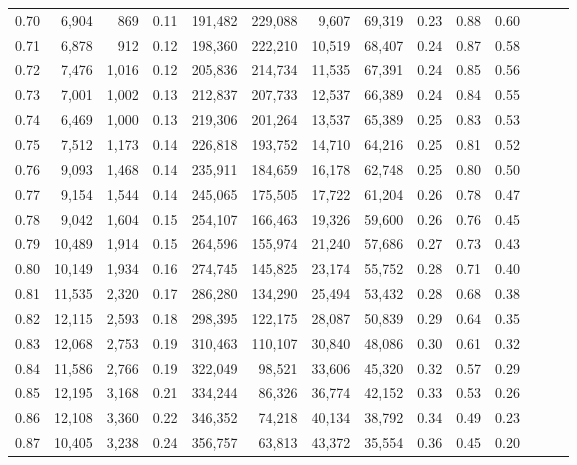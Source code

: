 \begin{tabular}{rrrrrrrrrrrrrr}
0.70 &   6,904 &    869 &  0.11 &  191,482 &  229,088 &   9,607 &  69,319 &  0.23 &  0.88 &      0.60 \\
0.71 &   6,878 &    912 &  0.12 &  198,360 &  222,210 &  10,519 &  68,407 &  0.24 &  0.87 &      0.58 \\
0.72 &   7,476 &  1,016 &  0.12 &  205,836 &  214,734 &  11,535 &  67,391 &  0.24 &  0.85 &      0.56 \\
0.73 &   7,001 &  1,002 &  0.13 &  212,837 &  207,733 &  12,537 &  66,389 &  0.24 &  0.84 &      0.55 \\
0.74 &   6,469 &  1,000 &  0.13 &  219,306 &  201,264 &  13,537 &  65,389 &  0.25 &  0.83 &      0.53 \\
0.75 &   7,512 &  1,173 &  0.14 &  226,818 &  193,752 &  14,710 &  64,216 &  0.25 &  0.81 &      0.52 \\
0.76 &   9,093 &  1,468 &  0.14 &  235,911 &  184,659 &  16,178 &  62,748 &  0.25 &  0.80 &      0.50 \\
0.77 &   9,154 &  1,544 &  0.14 &  245,065 &  175,505 &  17,722 &  61,204 &  0.26 &  0.78 &      0.47 \\
0.78 &   9,042 &  1,604 &  0.15 &  254,107 &  166,463 &  19,326 &  59,600 &  0.26 &  0.76 &      0.45 \\
0.79 &  10,489 &  1,914 &  0.15 &  264,596 &  155,974 &  21,240 &  57,686 &  0.27 &  0.73 &      0.43 \\
0.80 &  10,149 &  1,934 &  0.16 &  274,745 &  145,825 &  23,174 &  55,752 &  0.28 &  0.71 &      0.40 \\
0.81 &  11,535 &  2,320 &  0.17 &  286,280 &  134,290 &  25,494 &  53,432 &  0.28 &  0.68 &      0.38 \\
0.82 &  12,115 &  2,593 &  0.18 &  298,395 &  122,175 &  28,087 &  50,839 &  0.29 &  0.64 &      0.35 \\
0.83 &  12,068 &  2,753 &  0.19 &  310,463 &  110,107 &  30,840 &  48,086 &  0.30 &  0.61 &      0.32 \\
0.84 &  11,586 &  2,766 &  0.19 &  322,049 &   98,521 &  33,606 &  45,320 &  0.32 &  0.57 &      0.29 \\
0.85 &  12,195 &  3,168 &  0.21 &  334,244 &   86,326 &  36,774 &  42,152 &  0.33 &  0.53 &      0.26 \\
0.86 &  12,108 &  3,360 &  0.22 &  346,352 &   74,218 &  40,134 &  38,792 &  0.34 &  0.49 &      0.23 \\
0.87 &  10,405 &  3,238 &  0.24 &  356,757 &   63,813 &  43,372 &  35,554 &  0.36 &  0.45 &      0.20 \\

\end{tabular}
